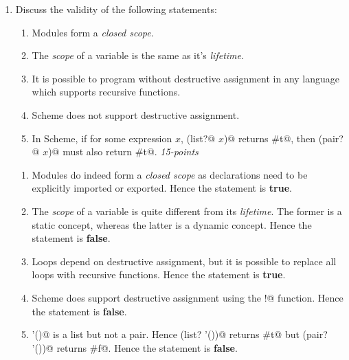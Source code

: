 \documentclass[12pt]{article}
\begin{document}
\begin{enumerate}
\item Discuss the validity of the following statements:

  \begin{enumerate}

  \item Modules form a \textit{closed scope}.

  \item The \textit{scope} of a variable is the same as it's
    \textit{lifetime}.

  \item It is possible to program without destructive assignment
    in any language which supports recursive functions.

  \item Scheme does not support destructive assignment.

  \item In Scheme, if for some expression $x$, \verb@(list?@
    $x$\verb@)@ returns \verb@#t@, then \verb@(pair?@ $x$\verb@)@ must
    also return \verb@#t@. \hfill{\textit{15-points}}

  \end{enumerate}
  \begin{enumerate}
  \item Modules do indeed form a \textit{closed scope} as declarations
    need to be explicitly imported or exported.  Hence the statement
    is \textbf{true}.

  \item The \textit{scope} of a variable is quite different from
    its \textit{lifetime}.  The former is a static concept, whereas
    the latter is a dynamic concept.  Hence the statement is \textbf{false}.

  \item Loops depend on destructive assignment, but it is possible to
    replace all loops with recursive functions.  Hence the statement is
    \textbf{true}.

  \item Scheme does support destructive assignment using the
    \verb@set!@ function.  Hence the statement is \textbf{false}.

  \item \verb@'()@ is a list but not a pair.  Hence \verb@(list? '())@
    returns \verb@#t@ but \verb@(pair? '())@ returns \verb@#f@.
    Hence the statement is \textbf{false}.
    
  \end{enumerate}
  
\end{enumerate}
\end{document}
